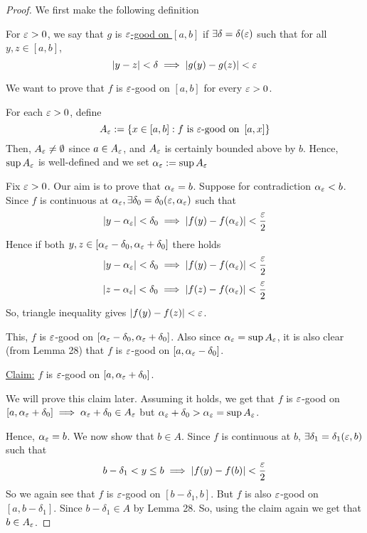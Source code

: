 \begin{proof}
    We first make the following definition

    For $\varepsilon > 0$, we say that $g$ is \underline{$\varepsilon$-good on $\left[a, b\right]$} if
    $\exists \delta = \delta(\varepsilon)$ such that for all $y, z \in \left[a, b\right]$,
    $$|y-z| < \delta \implies |g(y) - g(z)| < \varepsilon$$

    We want to prove that $f$ is $\varepsilon$-good on $\left[a, b\right]$ for every $\varepsilon > 0$.

    For each $\varepsilon > 0$, define 
    $$A_\varepsilon := \left\{x \in \left[a, b\right]: f \text{ is }\varepsilon\text{-good on } \left[a, x\right] \right\}$$
    Then, $A_\varepsilon \neq \emptyset$ since $a \in A_\varepsilon$, and $A_\varepsilon$ is certainly bounded above by $b$.
    Hence, $\sup A_\varepsilon$ is well-defined and we set $\alpha_\varepsilon := \sup A_\varepsilon$ 

    Fix $\varepsilon > 0$. Our aim is to prove that $\alpha_\varepsilon = b$. Suppose for contradiction $\alpha_\varepsilon < b$.
    Since $f$ is continuous at $\alpha_\varepsilon, \exists\delta_0 = \delta_0(\varepsilon, \alpha_\varepsilon)$ such that
    $$|y-\alpha_\varepsilon| < \delta_0 \implies |f(y) - f(\alpha_\varepsilon)| < \frac{\varepsilon}{2}$$
    Hence if both $y, z \in \left[\alpha_\varepsilon - \delta_0, \alpha_\varepsilon + \delta_0\right]$ there holds
    $$|y - \alpha_\varepsilon| < \delta_0 \implies |f(y) - f(\alpha_\varepsilon)| < \frac{\varepsilon}{2}$$
    $$|z - \alpha_\varepsilon| < \delta_0 \implies |f(z) - f(\alpha_\varepsilon)| < \frac{\varepsilon}{2}$$
    So, triangle inequality gives $|f(y) - f(z)| < \varepsilon$.

    This, $f$ is $\varepsilon$-good on $\left[\alpha_\varepsilon - \delta_0, \alpha_\varepsilon + \delta_0\right]$.
    Also since $\alpha_\varepsilon = \sup A_\varepsilon$, it is also clear (from Lemma 28) that $f$ is $\varepsilon$-good on $\left[a, \alpha_\varepsilon - \delta_0\right]$.

    \underline{Claim:} $f$ is $\varepsilon$-good on $\left[a, \alpha_\varepsilon + \delta_0\right]$.

    We will prove this claim later. Assuming it holds, we get that
    $f$ is $\varepsilon$-good on $\left[a, \alpha_\varepsilon + \delta_0\right] \implies \alpha_\varepsilon + \delta_0 \in A_\varepsilon$ 
    but $\alpha_\varepsilon + \delta_0 > \alpha_\varepsilon = \sup A_\varepsilon$.

    Hence, $\alpha_\varepsilon = b$. We now show that $b \in A$. Since $f$ is continuous at $b$, 
    $\exists \delta_1 = \delta_1(\varepsilon, b)$ such that
    $$b - \delta_1 < y \leq b \implies |f(y) - f(b)| < \frac{\varepsilon}{2}$$
    So we again see that $f$ is $\varepsilon$-good on $\left[b - \delta_1, b\right]$.
    But $f$ is also $\varepsilon$-good on $\left[a, b - \delta_1\right]$.
    Since $b - \delta_1 \in A$ by Lemma 28. 
    So, using the claim again we get that $b \in A_\varepsilon$.
\end{proof}

